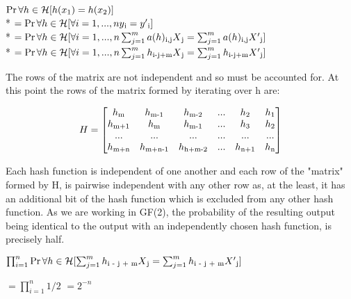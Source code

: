 \documentclass[11pt]{article}
\begin{document}
\begin{flushleft}
$\Pr\forall h \in \mathcal{H} [h(x\textsubscript{1}) = h(x\textsubscript{2})]$ \\*
$ = \Pr\forall h \in \mathcal{H} [\forall i = 1, ... , n y\textsubscript{i} = y'\textsubscript{i}]$ \\*
$ = \Pr\forall h \in \mathcal{H} [\forall i = 1, ... , n \sum_{j=1}^{m} a(h)\textsubscript{i,j}X\textsubscript{j}  = \sum_{j=1}^{m} a(h)\textsubscript{i,j}X'\textsubscript{j}  ]$ \\*
$ = \Pr\forall h \in \mathcal{H} [\forall i = 1, ... , n \sum_{j=1}^{m} h\textsubscript{i-j+m}X\textsubscript{j}  = \sum_{j=1}^{m} h\textsubscript{i-j+m}X'\textsubscript{j}  ]$

The rows of the matrix are not independent and so must be accounted for. At this point the rows of the matrix formed by iterating over h are:

\[
H=
  \begin{bmatrix}
  h\textsubscript{m} & h\textsubscript{m-1} & h\textsubscript{m-2} & ... & h\textsubscript{2} & h\textsubscript{1} \\
  h\textsubscript{m+1} & h\textsubscript{m} & h\textsubscript{m-1} & ... & h\textsubscript{3} & h\textsubscript{2} \\
  ... & ... & ... & ... & ... & ... \\
  h\textsubscript{m+n} & h\textsubscript{m+n-1} & h\textsubscript{h+m-2} & ... & h\textsubscript{n+1} & h\textsubscript{n}
  \end{bmatrix}
\]

Each hash function is independent of one another and each row of the "matrix" formed by H, is pairwise independent with any other row as, at the least, it has an additional bit of the hash function which is excluded from any other hash function. As we are working in GF(2), the probability of the resulting output being identical to the output with an independently chosen hash function, is precisely half.

$ \prod_{i=1}^{n} \Pr\forall h \in \mathcal{H} [\sum_{j=1}^{m} h\textsubscript{i - j + m}X\textsubscript{j} = \sum_{j=1}^{m} h\textsubscript{i - j + m}X'\textsubscript{j}]$

$ = \prod_{i=1}^{n} 1 / 2$
$ = 2 ^{-n} $




\end{flushleft}
\end{document}
